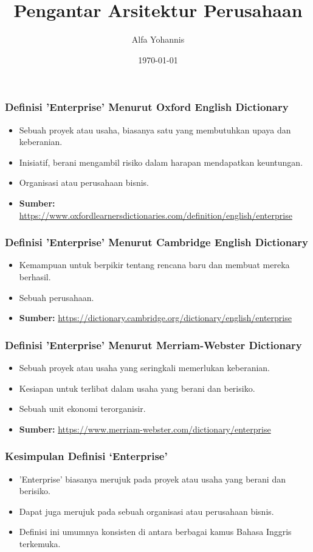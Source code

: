 \documentclass{beamer}
\title{Pengantar Arsitektur Perusahaan}
\author{Alfa Yohannis}
\date{\today}
\begin{document}
	
	\frame{\titlepage}
	
	\begin{frame}
		\frametitle{Definisi 'Enterprise' Menurut Oxford English Dictionary}
		\begin{itemize}
			\item Sebuah proyek atau usaha, biasanya satu yang membutuhkan upaya dan keberanian.
			\item Inisiatif, berani mengambil risiko dalam harapan mendapatkan keuntungan.
			\item Organisasi atau perusahaan bisnis.
			\item \textbf{Sumber:} \url{https://www.oxfordlearnersdictionaries.com/definition/english/enterprise}
		\end{itemize}
	\end{frame}
	
	\begin{frame}
		\frametitle{Definisi 'Enterprise' Menurut Cambridge English Dictionary}
		\begin{itemize}
			\item Kemampuan untuk berpikir tentang rencana baru dan membuat mereka berhasil.
			\item Sebuah perusahaan.
			\item \textbf{Sumber:} \url{https://dictionary.cambridge.org/dictionary/english/enterprise}
		\end{itemize}
	\end{frame}
	
	\begin{frame}
		\frametitle{Definisi 'Enterprise' Menurut Merriam-Webster Dictionary}
		\begin{itemize}
			\item Sebuah proyek atau usaha yang seringkali memerlukan keberanian.
			\item Kesiapan untuk terlibat dalam usaha yang berani dan berisiko.
			\item Sebuah unit ekonomi terorganisir.
			\item \textbf{Sumber:} \url{https://www.merriam-webster.com/dictionary/enterprise}
		\end{itemize}
	\end{frame}
	
	\begin{frame}
		\frametitle{Kesimpulan Definisi `Enterprise'}
		\begin{itemize}
			\item 'Enterprise' biasanya merujuk pada proyek atau usaha yang berani dan berisiko.
			\item Dapat juga merujuk pada sebuah organisasi atau perusahaan bisnis.
			\item Definisi ini umumnya konsisten di antara berbagai kamus Bahasa Inggris terkemuka.
		\end{itemize}
	\end{frame}
	
\end{document}
